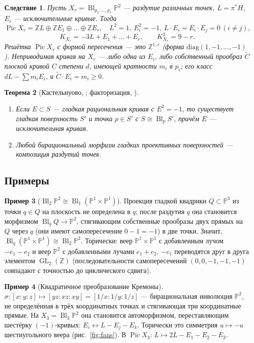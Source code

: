 \documentclass[11pt,a4paper]{article}
\theoremstyle{plain}
\newtheorem{theorem}{Теорема}[section]
\newtheorem{corollary}[theorem]{Следствие}
\theoremstyle{definition}
\newtheorem{example}[theorem]{Пример}
\theoremstyle{remark}
\newcommand{\Z}{\mathbb{Z}}
\newcommand{\PP}{\mathbb{P}}
\DeclareMathOperator{\Pic}{Pic}
\DeclareMathOperator{\Bl}{Bl}
\DeclareMathOperator{\GL}{GL}
\begin{document}
\begin{corollary}\label{cor:Blr}
Пусть $X_r=\Bl_{p_1,\dots,p_r}\PP^2$ --- раздутие различных точек, $L=\pi^*H$, $E_i$ --- исключительные кривые.
Тогда
\[
\Pic X_r=\Z L\oplus\Z E_1\oplus\dots\oplus\Z E_r,\quad L^2=1,\ E_i^2=-1,\ L\cdot E_i=E_i\cdot E_j=0\ (i\ne j),
\]
\[
K_{X_r}=-3L+E_1+\dots+E_r,\qquad K_{X_r}^2=9-r .
\]
Решётка $\Pic X_r$ с формой пересечения --- это $\Z^{1,r}$ (форма $\mathrm{diag}(1,-1,\dots,-1)$).
Неприводимая кривая на $X_r$ --- либо одна из $E_i$, либо собственный прообраз $\tilde C$ плоской кривой $C$
степени $d$, имеющей кратности $m_i$ в $p_i$; его класс $dL-\sum m_iE_i$, и $\tilde C\cdot E_i=m_i\ge0$.
\end{corollary}

\begin{theorem}[{Кастельнуово, \cite[V.5.7]{Ha}; факторизация, \cite[V.5.3]{Ha}}]\label{thm:Castelnuovo}
\begin{enumerate}
\item Если $E\subset S$ --- гладкая рациональная кривая с $E^2=-1$, то существует гладкая поверхность $S'$ и
точка $p\in S'$ с $S\cong\Bl_pS'$, причём $E$ --- исключительная кривая.
\item Любой бирациональный морфизм гладких проективных поверхностей --- композиция раздутий точек.
\end{enumerate}
\end{theorem}

\subsection{Примеры}

\begin{example}[$\Bl_2\PP^2\cong\Bl_1(\PP^1\times\PP^1)$]
Проекция гладкой квадрики $Q\subset\PP^3$ из точки $q\in Q$ на плоскость не определена в $q$; после
раздутия $q$ она становится морфизмом $\Bl_qQ\to\PP^2$, стягивающим собственные прообразы двух прямых на $Q$
через $q$ (они имеют самопересечение $0-1=-1$) в две точки. Значит, $\Bl_q(\PP^1\times\PP^1)\cong
\Bl_2\PP^2$. Торически: веер $\PP^1\times\PP^1$ с добавленным лучом $-e_1-e_2$ и веер $\PP^2$ с
добавленными лучами $e_1+e_2$, $-e_1$ переводятся друг в друга элементом $\GL_2(\Z)$
(последовательности самопересечений $(0,0,-1,-1,-1)$ совпадают с точностью до циклического сдвига).
\end{example}

\begin{example}[Квадратичное преобразование Кремоны]
$\sigma\colon[x:y:z]\mapsto[yz:xz:xy]=[1/x:1/y:1/z]$ --- бирациональная инволюция $\PP^2$, не определённая в
трёх координатных точках и стягивающая три координатные прямые. На $X_3=\Bl_3\PP^2$ она становится
автоморфизмом, переставляющим шестёрку $(-1)$-кривых: $E_i\leftrightarrow L-E_j-E_k$. Торически это симметрия
$u\mapsto-u$ шестиугольного веера (рис.~\ref{fig:fans}). В $\Pic X_3$: $L\mapsto2L-E_1-E_2-E_3$.
\end{example}
\end{document}
